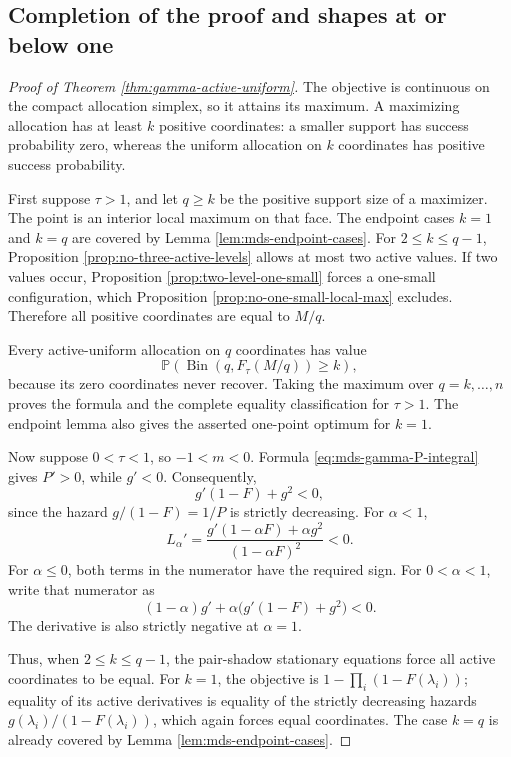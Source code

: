 \documentclass[11pt]{article}
\theoremstyle{definition}
\theoremstyle{remark}
\DeclareMathOperator{\Bin}{Bin}
\newcommand{\Pbb}{\mathbb P}
\newcommand{\1}{\mathbf 1}
\begin{document}
\subsection{Completion of the proof and shapes at or below one}

\begin{proof}[Proof of Theorem \ref{thm:gamma-active-uniform}]
The objective is continuous on the compact allocation simplex, so it attains its maximum.  A maximizing allocation has at least \(k\) positive coordinates: a smaller support has success probability zero, whereas the uniform allocation on \(k\) coordinates has positive success probability.

First suppose \(\tau>1\), and let \(q\ge k\) be the positive support size of a maximizer.  The point is an interior local maximum on that face.  The endpoint cases \(k=1\) and \(k=q\) are covered by Lemma \ref{lem:mds-endpoint-cases}.  For \(2\le k\le q-1\), Proposition \ref{prop:no-three-active-levels} allows at most two active values.  If two values occur, Proposition \ref{prop:two-level-one-small} forces a one-small configuration, which Proposition \ref{prop:no-one-small-local-max} excludes.  Therefore all positive coordinates are equal to \(M/q\).

Every active-uniform allocation on \(q\) coordinates has value
\[
  \Pbb\left(\Bin(q,F_\tau(M/q))\ge k\right),
\]
because its zero coordinates never recover.  Taking the maximum over \(q=k,\ldots,n\) proves the formula and the complete equality classification for \(\tau>1\).  The endpoint lemma also gives the asserted one-point optimum for \(k=1\).

Now suppose \(0<\tau<1\), so \(-1<m<0\).  Formula \eqref{eq:mds-gamma-P-integral} gives \(P'>0\), while \(g'<0\).  Consequently,
\[
  g'(1-F)+g^2<0,
\]
since the hazard \(g/(1-F)=1/P\) is strictly decreasing.  For \(\alpha<1\),
\[
  L_\alpha'
  =\frac{g'(1-\alpha F)+\alpha g^2}{(1-\alpha F)^2}<0.
\]
For \(\alpha\le0\), both terms in the numerator have the required sign.  For \(0<\alpha<1\), write that numerator as
\[
  (1-\alpha)g'+\alpha\bigl(g'(1-F)+g^2\bigr)<0.
\]
The derivative is also strictly negative at \(\alpha=1\).

Thus, when \(2\le k\le q-1\), the pair-shadow stationary equations force all active coordinates to be equal.  For \(k=1\), the objective is \(1-\prod_i(1-F(\lambda_i))\); equality of its active derivatives is equality of the strictly decreasing hazards \(g(\lambda_i)/(1-F(\lambda_i))\), which again forces equal coordinates.  The case \(k=q\) is already covered by Lemma \ref{lem:mds-endpoint-cases}.


\end{proof}
\end{document}
